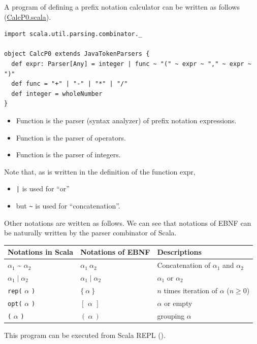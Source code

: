 \documentclass[11pt]{article}
\begin{document}
A program of defining a prefix notation calculator can be written as
follows (\href{prog/parser/CalcP0.scala}{CalcP0.scala}). 
\begin{verbatim}
import scala.util.parsing.combinator._

object CalcP0 extends JavaTokenParsers {
  def expr: Parser[Any] = integer | func ~ "(" ~ expr ~ "," ~ expr ~ ")"
  def func = "+" | "-" | "*" | "/"
  def integer = wholeNumber
}
\end{verbatim}
\begin{itemize}
\item Function  is the parser (syntax analyzer) of
prefix notation expressions.
\item Function  is the parser of operators.
\item Function  is the parser of integers.
\end{itemize}

Note that, as is written in the definition of the function expr, 
\begin{itemize}
\item \texttt{|} is used for ``or''
\item but \texttt{\textasciitilde{}} is used for ``concatenation''.
\end{itemize}

Other notations are written as follows. 
We can see that notations of EBNF can be naturally written by the
parser combinator of Scala. 

\begin{center}
\begin{tabular}{lll}
\hline
Notations in Scala & Notations of EBNF & Descriptions\\
\hline
\(\alpha_1\) \textasciitilde{} \(\alpha_2\) & \(\alpha_1\ \alpha_2\) & Concatenation of \(\alpha_1\) and \(\alpha_2\)\\
\(\alpha_1 \mid \alpha_2\) & \(\alpha_1 \mid \alpha_2\) & \(\alpha_1\) or \(\alpha_2\)\\
\texttt{rep(} \(\alpha\) \texttt{)} & \(\{\ \alpha\ \}\) & \(n\) times iteration of \(\alpha\) (\(n \ge 0\))\\
\texttt{opt(} \(\alpha\) \texttt{)} & \([\ \,\alpha\ \,]\) & \(\alpha\) or empty\\
\texttt{(} \(\alpha\) \texttt{)} & \((\ \alpha\ )\) & grouping \(\alpha\)\\
\hline
\end{tabular}
\end{center}

This program can be executed from Scala REPL 
(). 
\end{document}
